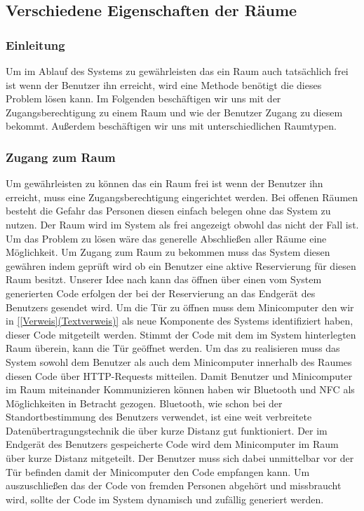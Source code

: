 \subsection{Verschiedene Eigenschaften der Räume}
\label{sec:Verschiedene Eigenschaften der Räume}


\subsubsection{Einleitung}
\label{sec:Verschiedene Eigenschaften der Räume Einleitung}

Um im Ablauf des Systems zu gewährleisten das ein Raum auch tatsächlich frei
ist wenn der Benutzer ihn erreicht, wird eine Methode benötigt die dieses
Problem lösen kann. Im Folgenden beschäftigen wir uns mit der
Zugangsberechtigung zu einem Raum und wie der Benutzer Zugang zu diesem
bekommt. Außerdem beschäftigen wir uns mit unterschiedlichen Raumtypen. 

\subsubsection{Zugang zum Raum}
\label{sec:Zugang zum Raum}

Um gewährleisten zu können das ein Raum frei ist wenn der Benutzer ihn
erreicht, muss eine Zugangsberechtigung eingerichtet werden. Bei offenen
Räumen besteht die Gefahr das Personen diesen einfach belegen ohne das System
zu nutzen. Der Raum wird im System als frei angezeigt obwohl das nicht der Fall
ist. Um das Problem zu lösen wäre das generelle Abschließen aller Räume eine
Möglichkeit. Um Zugang zum Raum zu bekommen muss das System diesen gewähren
indem geprüft wird ob ein Benutzer eine aktive Reservierung für diesen Raum
besitzt. Unserer Idee nach kann das öffnen über einen vom System generierten
Code erfolgen der bei der Reservierung an das Endgerät des Benutzers gesendet
wird. Um die Tür zu öffnen muss \zB dem Minicomputer den wir in \ref{[Verweis](Textverweis)}
als neue Komponente des Systems identifiziert haben, dieser Code mitgeteilt
werden. Stimmt der Code mit dem im System hinterlegten Raum überein, kann die
Tür geöffnet werden. Um das zu realisieren muss das System sowohl dem Benutzer
als auch dem Minicomputer innerhalb des Raumes diesen Code über HTTP-Requests
mitteilen. Damit Benutzer und Minicomputer im Raum miteinander Kommunizieren
können haben wir Bluetooth und NFC als Möglichkeiten in Betracht gezogen.
Bluetooth, wie schon bei der Standortbestimmung des Benutzers verwendet, ist
eine weit verbreitete Datenübertragungstechnik die über kurze Distanz gut
funktioniert. Der im Endgerät des Benutzers gespeicherte Code wird dem
Minicomputer im Raum über kurze Distanz mitgeteilt. Der Benutzer muss sich
dabei unmittelbar vor der Tür befinden damit der Minicomputer den Code empfangen
kann. Um auszuschließen das der Code von fremden Personen abgehört und
missbraucht wird, sollte der Code im System dynamisch und zufällig generiert
werden. 

